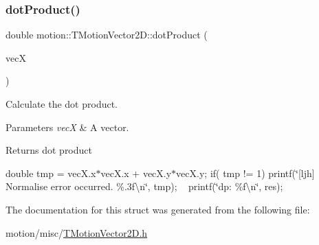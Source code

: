 \subsubsection{\texorpdfstring{dot\+Product()}{dotProduct()}}
{\footnotesize\ttfamily double motion\+::\+T\+Motion\+Vector2\+D\+::dot\+Product (\begin{DoxyParamCaption}\item[{\mbox{\hyperlink{structmotion_1_1TMotionVector2D}{T\+Motion\+Vector2D}}}]{vecX }\end{DoxyParamCaption})\hspace{0.3cm}{\ttfamily [inline]}}

Calculate the dot product. 
\begin{DoxyParams}{Parameters}
{\em vecX} & A vector. \\
\hline
\end{DoxyParams}
\begin{DoxyReturn}{Returns}
dot product 
\end{DoxyReturn}
double tmp = vec\+X.\+x$\ast$vecX.x + vec\+X.\+y$\ast$vecX.y; if( tmp != 1) printf(\char`\"{}\mbox{[}ljh\mbox{]} Normalise error occurred. \%.\+3f\textbackslash{}n\char`\"{}, tmp); ~\newline
 printf(\char`\"{}dp\+: \%f\textbackslash{}n\char`\"{}, res); 

The documentation for this struct was generated from the following file\+:\begin{DoxyCompactItemize}
\item 
motion/misc/\mbox{\hyperlink{TMotionVector2D_8h}{T\+Motion\+Vector2\+D.\+h}}\end{DoxyCompactItemize}
